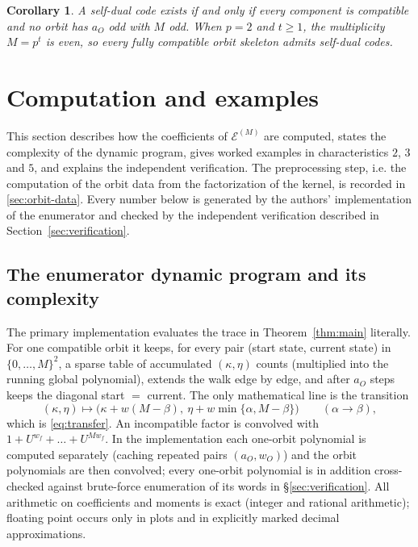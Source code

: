 \documentclass[preprint,12pt,a4paper]{elsarticle}
\newcommand{\Epoly}{\mathscr E}
\newtheorem{corollary}[theorem]{Corollary}
\theoremstyle{definition}
\theoremstyle{remark}
\begin{document}
\begin{corollary}\label{cor:self-dual}
A self-dual code exists if and only if every component is compatible and no
orbit has $a_O$ odd with $M$ odd.  When $p=2$ and $t\geq1$, the multiplicity
$M=p^t$ is even, so every fully compatible orbit skeleton admits self-dual
codes.
\end{corollary}

\section{Computation and examples}\label{sec:examples}

This section describes how the coefficients of $\Epoly^{(M)}$ are computed,
states the complexity of the dynamic program, gives worked examples in
characteristics $2$, $3$ and $5$, and explains the independent verification.
The preprocessing step, i.e. the computation of the orbit data from the
factorization of the kernel, is recorded in \ref{sec:orbit-data}.  Every number below is generated by the
authors' implementation of the enumerator and checked by the independent
verification described in Section~\ref{sec:verification}.

\subsection{The enumerator dynamic program and its complexity}
\label{sec:dp}

The primary implementation evaluates the trace in
Theorem~\ref{thm:main} literally.  For one compatible orbit it keeps, for
every pair (start state, current state) in $\{0,\ldots,M\}^2$, a sparse
table of accumulated $(\kappa,\eta)$ counts (multiplied into the running
global polynomial), extends the walk edge by edge, and after $a_O$ steps keeps
the diagonal start $=$ current.  The only mathematical line is the transition
{\small
\[
(\kappa,\eta)\longmapsto
 \bigl(\kappa+w(M-\beta),\ \eta+w\min\{\alpha,M-\beta\}\bigr)
 \qquad(\alpha\to\beta),
\]
}
which is \eqref{eq:transfer}.  An incompatible factor is convolved with
$1+U^{w_f}+\dots+U^{Mw_f}$.  In the implementation each one-orbit polynomial is
computed separately (caching repeated pairs $(a_O,w_O)$) and the orbit
polynomials are then convolved; every one-orbit polynomial is in addition
cross-checked against brute-force enumeration of its words in
\S\ref{sec:verification}.  All arithmetic on
coefficients and moments is exact (integer and rational arithmetic); floating
point occurs only in plots and in explicitly marked decimal approximations.
\end{document}
